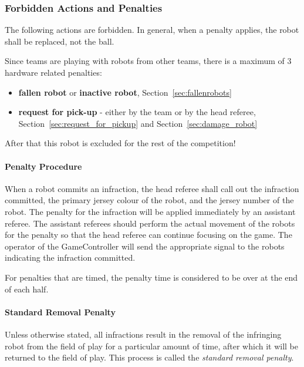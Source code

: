 \newpage

\subsubsection{Forbidden Actions and Penalties}
\label{sec:forbidden_act}

The following actions are forbidden. In general, when a penalty applies, the robot shall be replaced, not the ball.

Since teams are playing with robots from other teams, there is a maximum of 3 hardware related penalties:
\begin{itemize}
	\item \textbf{fallen robot} or \textbf{inactive robot}, \cf Section~\ref{sec:fallenrobots}
	\item \textbf{request for pick-up} - either by the team or by the head referee, \cf Section~\ref{sec:request_for_pickup} and Section~\ref{sec:damage_robot}
\end{itemize}
After that this robot is excluded for the rest of the competition!

\paragraph{Penalty Procedure}
\label{sec:penalty_procedure}

When a robot commits an infraction, the head referee shall call out the infraction committed, the primary jersey colour of the robot, and the jersey number of the robot. The penalty for the infraction will be applied immediately by an assistant referee. The assistant referees should perform the actual movement of the robots for the penalty so that the head referee can continue focusing on the game. The operator of the GameController will send the appropriate signal to the robots indicating the infraction committed.

For penalties that are timed, the penalty time is considered to be over at the end of each half.

\paragraph{Standard Removal Penalty}
\label{sec:removal_penalty}

Unless otherwise stated, all infractions result in the removal of the infringing robot from the field of play for a particular amount of time, after which it will be returned to the field of play. This process is called the \textit{standard removal penalty}.

